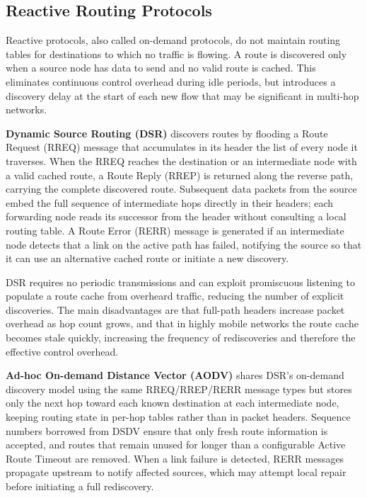 
\subsection{Reactive Routing Protocols}

Reactive protocols, also called on-demand protocols, do not maintain routing tables for
destinations to which no traffic is flowing. A route is discovered only when a source node has
data to send and no valid route is cached. This eliminates continuous control overhead during
idle periods, but introduces a discovery delay at the start of each new flow that may be
significant in multi-hop networks.

\textbf{Dynamic Source Routing (DSR)} discovers routes by flooding a Route Request (RREQ)
message that accumulates in its header the list of every node it traverses. When the RREQ
reaches the destination or an intermediate node with a valid cached route, a Route Reply
(RREP) is returned along the reverse path, carrying the complete discovered route. Subsequent
data packets from the source embed the full sequence of intermediate hops directly in their
headers; each forwarding node reads its successor from the header without consulting a local
routing table. A Route Error (RERR) message is generated if an intermediate node detects that
a link on the active path has failed, notifying the source so that it can use an alternative
cached route or initiate a new discovery.

DSR requires no periodic transmissions and can exploit promiscuous listening to populate a
route cache from overheard traffic, reducing the number of explicit discoveries. The main
disadvantages are that full-path headers increase packet overhead as hop count grows, and that
in highly mobile networks the route cache becomes stale quickly, increasing the frequency of
rediscoveries and therefore the effective control overhead.

\textbf{Ad-hoc On-demand Distance Vector (AODV)} shares DSR's on-demand discovery model
using the same RREQ/RREP/RERR message types but stores only the next hop toward each
known destination at each intermediate node, keeping routing state in per-hop tables rather
than in packet headers. Sequence numbers borrowed from DSDV ensure that only fresh route
information is accepted, and routes that remain unused for longer than a configurable Active
Route Timeout are removed. When a link failure is detected, RERR messages propagate
upstream to notify affected sources, which may attempt local repair before initiating a full
rediscovery.

